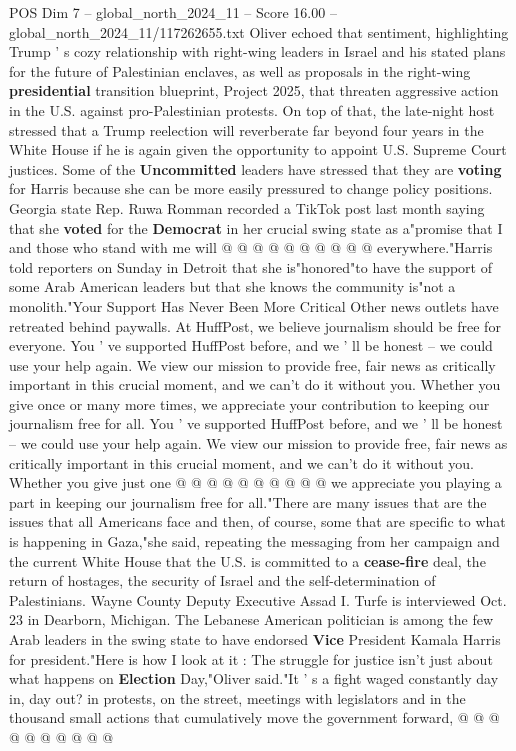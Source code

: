 \begin{textsample}{POS Dim 7 – global\_north\_2024\_11 – Score 16.00 – global\_north\_2024\_11/117262655.txt}
Oliver echoed that sentiment, highlighting Trump ' s cozy relationship with right-wing leaders in Israel and his stated plans for the future of Palestinian enclaves, as well as proposals in the right-wing \textbf{presidential} transition blueprint, Project 2025, that threaten aggressive action in the U.S. against pro-Palestinian protests.
On top of that, the late-night host stressed that a Trump reelection will reverberate far beyond four years in the White House if he is again given the opportunity to appoint U.S.
Supreme Court justices.
Some of the \textbf{Uncommitted} leaders have stressed that they are \textbf{voting} for Harris because she can be more easily pressured to change policy positions.
Georgia state Rep.
Ruwa Romman recorded a TikTok post last month saying that she \textbf{voted} for the \textbf{Democrat} in her crucial swing state as a"promise that I and those who stand with me will @ @ @ @ @ @ @ @ @ @ everywhere."Harris told reporters on Sunday in Detroit that she is"honored"to have the support of some Arab American leaders but that she knows the community is"not a monolith."Your Support Has Never Been More Critical Other news outlets have retreated behind paywalls.
At HuffPost, we believe journalism should be free for everyone.
You ' ve supported HuffPost before, and we ' ll be honest -- we could use your help again.
We view our mission to provide free, fair news as critically important in this crucial moment, and we can't do it without you.
Whether you give once or many more times, we appreciate your contribution to keeping our journalism free for all.
You ' ve supported HuffPost before, and we ' ll be honest -- we could use your help again.
We view our mission to provide free, fair news as critically important in this crucial moment, and we can't do it without you.
Whether you give just one @ @ @ @ @ @ @ @ @ @ we appreciate you playing a part in keeping our journalism free for all."There are many issues that are the issues that all Americans face and then, of course, some that are specific to what is happening in Gaza,"she said, repeating the messaging from her campaign and the current White House that the U.S. is committed to a \textbf{cease-fire} deal, the return of hostages, the security of Israel and the self-determination of Palestinians.
Wayne County Deputy Executive Assad I.
Turfe is interviewed Oct. 23 in Dearborn, Michigan.
The Lebanese American politician is among the few Arab leaders in the swing state to have endorsed \textbf{Vice} President Kamala Harris for president."Here is how I look at it : The struggle for justice isn't just about what happens on \textbf{Election} Day,"Oliver said."It ' s a fight waged constantly day in, day out? in protests, on the street, meetings with legislators and in the thousand small actions that cumulatively move the government forward, @ @ @ @ @ @ @ @ @ @

\end{textsample}
